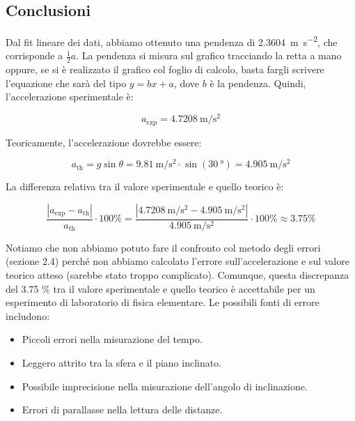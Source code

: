 \subsection{Conclusioni}
Dal fit lineare dei dati, abbiamo ottenuto una pendenza di \SI{2.3604}{\metre\per\second\squared}, che corrisponde a $\frac{1}{2}a$. La pendenza si misura sul grafico tracciando la retta a mano  oppure, se si è realizzato il grafico col foglio di calcolo, basta fargli scrivere l'equazione che sarà del tipo $y= bx +a$, dove $b$ è la pendenza. Quindi, l'accelerazione sperimentale è:

\begin{equation}
    a_{\text{exp}} = \SI{4.7208}{\metre\per\second\squared}
\end{equation}

Teoricamente, l'accelerazione dovrebbe essere:

\begin{equation}
    a_{\text{th}} = g\sin\theta = \SI{9.81}{\metre\per\second\squared} \cdot \sin(\SI{30}{\degree}) = \SI{4.905}{\metre\per\second\squared}
\end{equation}

La differenza relativa tra il valore sperimentale e quello teorico è:

\begin{equation}
    \frac{|a_{\text{exp}} - a_{\text{th}}|}{a_{\text{th}}} \cdot 100\% = \frac{|\SI{4.7208}{\metre\per\second\squared} - \SI{4.905}{\metre\per\second\squared}|}{\SI{4.905}{\metre\per\second\squared}} \cdot 100\% \approx 3.75\%
\end{equation}

Notiamo che non abbiamo potuto fare il confronto col metodo degli errori (sezione 2.4) perché non abbiamo calcolato l'errore sull'accelerazione e sul valore teorico atteso (sarebbe stato troppo complicato). Comunque, questa discrepanza del 3.75 \% tra il valore sperimentale e quello teorico è accettabile per un esperimento di laboratorio di fisica elementare. Le possibili fonti di errore includono:

\begin{itemize}
    \item Piccoli errori nella misurazione del tempo.
    \item Leggero attrito tra la sfera e il piano inclinato.
    \item Possibile imprecisione nella misurazione dell'angolo di inclinazione.
    \item Errori di parallasse nella lettura delle distanze.
\end{itemize}


